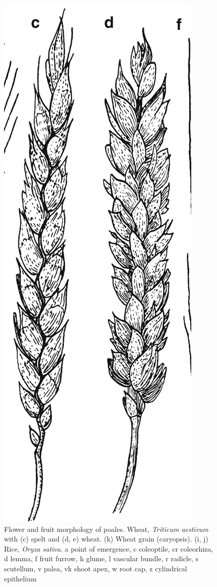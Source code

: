\documentclass[]{article}
\begin{document}
\begin{figure}

{\centering \includegraphics[width=0.8\linewidth]{./images/wheat_spike} 

}

\caption{Flower and fruit morphology of poales. Wheat, \textit{Triticum aestivum} with (c) spelt and (d, e) wheat. (k) Wheat grain (caryopsis). (i, j) Rice, \textit{Oryza sativa}. a point of emergence, c coleoptile, cr coleorhiza, d lemma, f fruit furrow, h glume, l vascular bundle, r radicle, s scutellum, v palea, vk shoot apex, w root cap, z cylindrical epithelium}\label{fig:floral-morphology-poales}
\end{figure}
\end{document}
